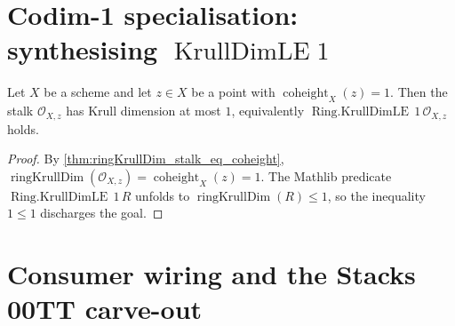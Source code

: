 \section{Codim-1 specialisation: synthesising \texorpdfstring{\(\operatorname{KrullDimLE} 1\)}{KrullDimLE 1}}
\label{sec:coheight_le_one_instance}


\begin{lemma}[Coheight \(= 1\) forces stalk \(\operatorname{Krull\,dim} \leq 1\)]\leanok
  \label{lem:ringKrullDimLE_of_coheight_eq_one}

  Let \(X\) be a scheme and let \(z \in X\) be a point with
  \(\operatorname{coheight}_{X}(z) = 1\). Then the stalk \(\mathcal{O}_{X,z}\)
  has Krull dimension at most \(1\), equivalently \(\operatorname{Ring.KrullDimLE}\,1\,
  \mathcal{O}_{X,z}\) holds.
\end{lemma}

\begin{proof}

  \leanok
  By \cref{thm:ringKrullDim_stalk_eq_coheight},
  \(\operatorname{ringKrullDim}(\mathcal{O}_{X,z}) = \operatorname{coheight}_{X}(z) = 1\).
  The Mathlib predicate \(\operatorname{Ring.KrullDimLE}\,1\,R\) unfolds to
  \(\operatorname{ringKrullDim}(R) \leq 1\), so the inequality \(1 \leq 1\)
  discharges the goal.
\end{proof}

\section{Consumer wiring and the Stacks 00TT carve-out}
\label{sec:coheight_consumers}

